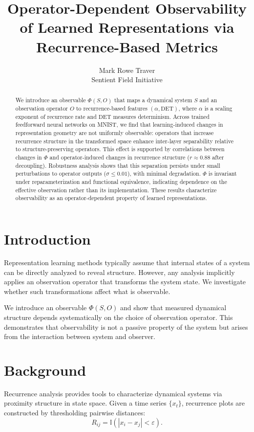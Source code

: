 \documentclass[11pt]{article}
\title{Operator-Dependent Observability of Learned Representations via Recurrence-Based Metrics}
\author{
Mark Rowe Traver \\
Sentient Field Initiative
}
\date{}
\begin{document}
\maketitle

\begin{abstract}
	We introduce an observable $\Phi(S, O)$ that maps a dynamical system $S$ and an observation operator $O$ to recurrence-based features $(\alpha, \mathrm{DET})$, where $\alpha$ is a scaling exponent of recurrence rate and $\mathrm{DET}$ measures determinism. Across trained feedforward neural networks on MNIST, we find that learning-induced changes in representation geometry are not uniformly observable: operators that increase recurrence structure in the transformed space enhance inter-layer separability relative to structure-preserving operators. This effect is supported by correlations between changes in $\Phi$ and operator-induced changes in recurrence structure ($r \approx 0.88$ after decoupling). Robustness analysis shows that this separation persists under small perturbations to operator outputs ($\sigma \leq 0.01$), with minimal degradation. $\Phi$ is invariant under reparameterization and functional equivalence, indicating dependence on the effective observation rather than its implementation. These results characterize observability as an operator-dependent property of learned representations.
\end{abstract}

\section{Introduction}

Representation learning methods typically assume that internal states of a system can be directly analyzed to reveal structure. However, any analysis implicitly applies an observation operator that transforms the system state. We investigate whether such transformations affect what is observable.

We introduce an observable $\Phi(S, O)$ and show that measured dynamical structure depends systematically on the choice of observation operator. This demonstrates that observability is not a passive property of the system but arises from the interaction between system and observer.

\section{Background}

Recurrence analysis provides tools to characterize dynamical systems via proximity structure in state space. Given a time series $\{x_t\}$, recurrence plots are constructed by thresholding pairwise distances:
\[
	R_{ij} = \mathbb{I}(|x_i - x_j| < \varepsilon).
\]
\end{document}
